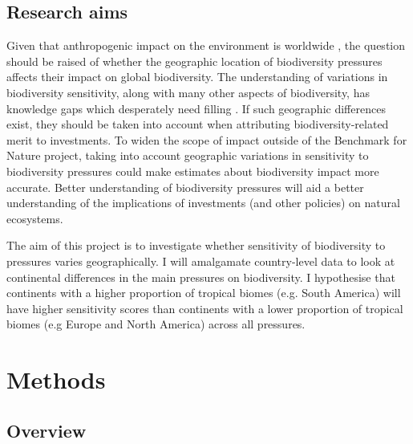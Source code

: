 \documentclass[11pt, a4paper, titlepage]{article}
\begin{document}
   	
   	\subsection*{Research aims}
   	
   	 Given that anthropogenic impact on the environment is worldwide \citep{plumptre2021might}, the question should be raised of whether the geographic location of biodiversity pressures affects their impact on global biodiversity. The understanding of variations in biodiversity sensitivity, along with many other aspects of biodiversity, has knowledge gaps which desperately need filling \citep{pereira2012global}. If such geographic differences exist, they should be taken into account when attributing biodiversity-related merit to investments. To widen the scope of impact outside of the Benchmark for Nature project, taking into account geographic variations in sensitivity to biodiversity pressures could make estimates about biodiversity impact more accurate. Better understanding of biodiversity pressures will aid a better understanding of the implications of investments (and other policies) on natural ecosystems.
   	 
 	The aim of this project is to investigate whether sensitivity of biodiversity to pressures varies geographically. I will amalgamate country-level data to look at continental differences in the main pressures on biodiversity. I hypothesise that continents with a higher proportion of tropical biomes (e.g. South America) will have higher sensitivity scores than continents with a lower proportion of tropical biomes (e.g Europe and North America) across all pressures.  \newpage

    \section*{Methods}
	\subsection*{Overview}
\end{document}
